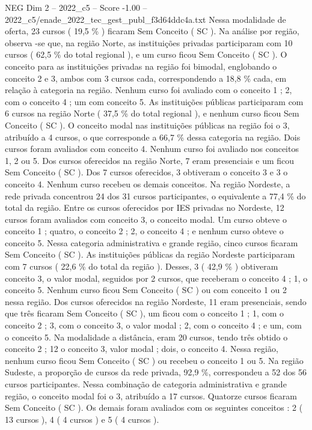 \begin{textsample}{NEG Dim 2 – 2022\_c5 – Score -1.00 – 2022\_c5/enade\_2022\_tec\_gest\_publ\_f3d64ddc4a.txt}
Nessa modalidade de oferta, 23 cursos ( 19,5 \% ) ficaram Sem Conceito ( SC ).
Na análise por região, observa -se que, na região Norte, as instituições privadas participaram com 10 cursos ( 62,5 \% do total regional ), e um curso ficou Sem Conceito ( SC ).
O conceito para as instituições privadas na região foi bimodal, englobando o conceito 2 e 3, ambos com 3 cursos cada, correspondendo a 18,8 \% cada, em relação à categoria na região.
Nenhum curso foi avaliado com o conceito 1 ; 2, com o conceito 4 ; um com conceito 5.
As instituições públicas participaram com 6 cursos na região Norte ( 37,5 \% do total regional ), e nenhum curso ficou Sem Conceito ( SC ).
O conceito modal nas instituições públicas na região foi o 3, atribuído a 4 cursos, o que corresponde a 66,7 \% dessa categoria na região.
Dois cursos foram avaliados com conceito 4.
Nenhum curso foi avaliado nos conceitos 1, 2 ou 5.
Dos cursos oferecidos na região Norte, 7 eram presenciais e um ficou Sem Conceito ( SC ).
Dos 7 cursos oferecidos, 3 obtiveram o conceito 3 e 3 o conceito 4.
Nenhum curso recebeu os demais conceitos.
Na região Nordeste, a rede privada concentrou 24 dos 31 cursos participantes, o equivalente a 77,4 \% do total da região.
Entre os cursos oferecidos por IES privadas no Nordeste, 12 cursos foram avaliados com conceito 3, o conceito modal.
Um curso obteve o conceito 1 ; quatro, o conceito 2 ; 2, o conceito 4 ; e nenhum curso obteve o conceito 5.
Nessa categoria administrativa e grande região, cinco cursos ficaram Sem Conceito ( SC ).
As instituições públicas da região Nordeste participaram com 7 cursos ( 22,6 \% do total da região ).
Desses, 3 ( 42,9 \% ) obtiveram conceito 3, o valor modal, seguidos por 2 cursos, que receberam o conceito 4 ; 1, o conceito 5.
Nenhum curso ficou Sem Conceito ( SC ) ou com conceito 1 ou 2 nessa região.
Dos cursos oferecidos na região Nordeste, 11 eram presenciais, sendo que três ficaram Sem Conceito ( SC ), um ficou com o conceito 1 ; 1, com o conceito 2 ; 3, com o conceito 3, o valor modal ; 2, com o conceito 4 ; e um, com o conceito 5.
Na modalidade a distância, eram 20 cursos, tendo três obtido o conceito 2 ; 12 o conceito 3, valor modal ; dois, o conceito 4.
Nessa região, nenhum curso ficou Sem Conceito ( SC ) ou recebeu o conceito 1 ou 5.
Na região Sudeste, a proporção de cursos da rede privada, 92,9 \%, correspondeu a 52 dos 56 cursos participantes.
Nessa combinação de categoria administrativa e grande região, o conceito modal foi o 3, atribuído a 17 cursos.
Quatorze cursos ficaram Sem Conceito ( SC ).
Os demais foram avaliados com os seguintes conceitos : 2 ( 13 cursos ), 4 ( 4 cursos ) e 5 ( 4 cursos ).

\end{textsample}

